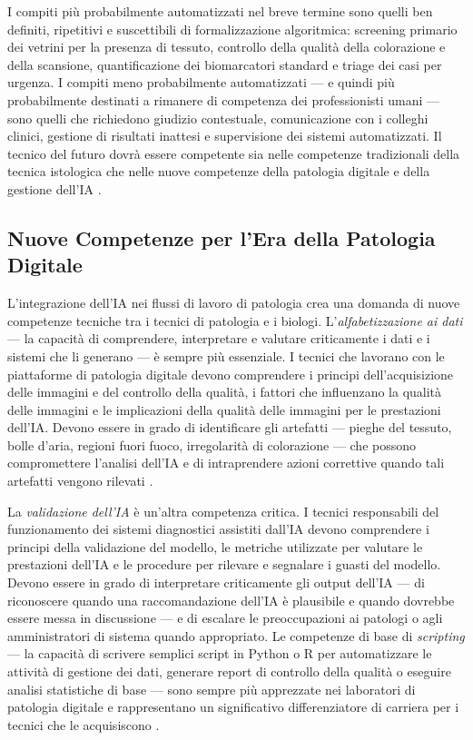 I compiti più probabilmente automatizzati nel breve termine sono quelli ben definiti, ripetitivi e suscettibili di formalizzazione algoritmica: screening primario dei vetrini per la presenza di tessuto, controllo della qualità della colorazione e della scansione, quantificazione dei biomarcatori standard e triage dei casi per urgenza. I compiti meno probabilmente automatizzati — e quindi più probabilmente destinati a rimanere di competenza dei professionisti umani — sono quelli che richiedono giudizio contestuale, comunicazione con i colleghi clinici, gestione di risultati inattesi e supervisione dei sistemi automatizzati. Il tecnico del futuro dovrà essere competente sia nelle competenze tradizionali della tecnica istologica che nelle nuove competenze della patologia digitale e della gestione dell'IA \cite{bankhead2022}.

\subsection{Nuove Competenze per l'Era della Patologia Digitale}

L'integrazione dell'IA nei flussi di lavoro di patologia crea una domanda di nuove competenze tecniche tra i tecnici di patologia e i biologi. L'\emph{alfabetizzazione ai dati} — la capacità di comprendere, interpretare e valutare criticamente i dati e i sistemi che li generano — è sempre più essenziale. I tecnici che lavorano con le piattaforme di patologia digitale devono comprendere i principi dell'acquisizione delle immagini e del controllo della qualità, i fattori che influenzano la qualità delle immagini e le implicazioni della qualità delle immagini per le prestazioni dell'IA. Devono essere in grado di identificare gli artefatti — pieghe del tessuto, bolle d'aria, regioni fuori fuoco, irregolarità di colorazione — che possono compromettere l'analisi dell'IA e di intraprendere azioni correttive quando tali artefatti vengono rilevati \cite{bankhead2022}.

La \emph{validazione dell'IA} è un'altra competenza critica. I tecnici responsabili del funzionamento dei sistemi diagnostici assistiti dall'IA devono comprendere i principi della validazione del modello, le metriche utilizzate per valutare le prestazioni dell'IA e le procedure per rilevare e segnalare i guasti del modello. Devono essere in grado di interpretare criticamente gli output dell'IA — di riconoscere quando una raccomandazione dell'IA è plausibile e quando dovrebbe essere messa in discussione — e di escalare le preoccupazioni ai patologi o agli amministratori di sistema quando appropriato. Le competenze di base di \emph{scripting} — la capacità di scrivere semplici script in Python o R per automatizzare le attività di gestione dei dati, generare report di controllo della qualità o eseguire analisi statistiche di base — sono sempre più apprezzate nei laboratori di patologia digitale e rappresentano un significativo differenziatore di carriera per i tecnici che le acquisiscono \cite{song2023}.

